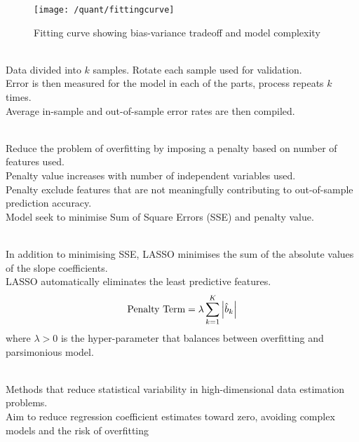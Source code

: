 \begin{figure}[H]
\centering
\texttt{[image: /quant/fittingcurve]}
\caption{Fitting curve showing bias-variance tradeoff and model complexity}
\end{figure}

\begin{definition} \\
Data divided into $k$ samples. Rotate each sample used for validation.\\
Error is then measured for the model in each of the parts, process repeats $k$ times.\\
Average in-sample and out-of-sample error rates are then compiled.
\end{definition}

\begin{definition} \\
Reduce the problem of overfitting by imposing a penalty based on number of features used.\\
Penalty value increases with number of independent variables used.\\
Penalty exclude features that are not meaningfully contributing to out-of-sample prediction accuracy.\\
Model seek to minimise Sum of Square Errors (SSE) and penalty value. 
\end{definition}

\begin{definition} \\
In addition to minimising SSE, LASSO minimises the sum of the absolute values of the slope coefficients.\\
LASSO automatically eliminates the least predictive features.
\begin{equation}
\text{Penalty Term} = \lambda \sum\limits_{k=1}^K \left\lvert\hat{b}_k\right\rvert \nonumber
\end{equation}
where $\lambda > 0$ is the hyper-parameter that balances between overfitting and parsimonious model.
\end{definition}

\begin{definition} \\
Methods that reduce statistical variability in high-dimensional data estimation problems.\\
Aim to reduce regression coefficient estimates toward zero, avoiding complex models and the risk of overfitting
\end{definition}

